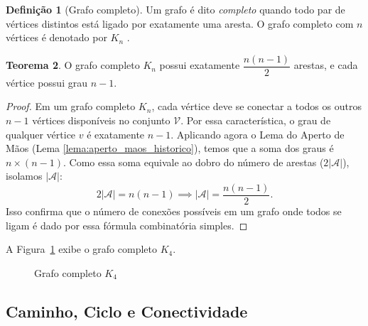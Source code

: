 \documentclass[
  12pt,
  oneside,
  a4paper,
  english,
  brazilian
  ]{abntex2}
\theoremstyle{definition}
\newtheorem{definicao}{Definição}[chapter]
\newtheorem{teorema}[definicao]{Teorema}
\begin{document}
\begin{definicao}[Grafo completo]
\label{def:completo}
  Um grafo é dito \textit{completo} quando todo par de vértices distintos está
  ligado por exatamente uma aresta. O grafo completo com $n$ vértices é
  denotado por $K_n$ \cite{bondy1976}.
\end{definicao}

\begin{teorema}
  O grafo completo $K_n$ possui exatamente $\dfrac{n(n-1)}{2}$ arestas, e
  cada vértice possui grau $n - 1$.
\end{teorema}

\begin{proof}
  Em um grafo completo $K_n$, cada vértice deve se conectar a todos os outros $n-1$ vértices disponíveis no conjunto $\mathcal{V}$. Por essa característica, o grau de qualquer vértice $v$ é exatamente $n-1$. Aplicando agora o Lema do Aperto de Mãos (Lema \ref{lema:aperto_maos_historico}), temos que a soma dos graus é $n \times (n-1)$. Como essa soma equivale ao dobro do número de arestas ($2|\mathcal{A}|$), isolamos $|\mathcal{A}|$:
  \[
    2|\mathcal{A}| = n(n-1) \implies |\mathcal{A}| = \frac{n(n-1)}{2}.
  \]
  Isso confirma que o número de conexões possíveis em um grafo onde todos se ligam é dado por essa fórmula combinatória simples.
\end{proof}

A Figura~\ref{fig:grafo_completo} exibe o grafo completo $K_4$.

\begin{figure}[htbp]
    \centering
    \caption{Grafo completo $K_4$}
    \label{fig:grafo_completo}
\end{figure}

\subsection{Caminho, Ciclo e Conectividade}
\end{document}
